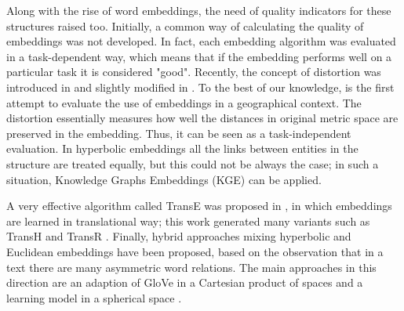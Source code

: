 Along with the rise of word embeddings, the need of quality indicators for these structures raised too. 
Initially, a common way of calculating the quality of embeddings was not developed. 
In fact, each embedding algorithm was evaluated in a task-dependent way, which means that if the embedding performs well on a particular task it is considered "good". 
Recently, the concept of distortion was introduced in \cite{sala2018representation} and slightly modified in \cite{dassereto2019evaluating}. 
To the best of our knowledge, \cite{dassereto2019evaluating} is the first attempt to evaluate the use of embeddings in a geographical context. 
The distortion essentially measures how well the distances in original metric space are preserved in the embedding. Thus, it can be seen as a task-independent evaluation. In hyperbolic embeddings all the links between entities in the structure are treated equally, but this could not be always the case; in such a situation, Knowledge Graphs Embeddings (KGE) can be applied. 

A very effective algorithm called TransE was proposed in \cite{bordes2013translating}, in which embeddings are learned in translational way; this work generated many variants such as TransH \cite{wang2014knowledge} and TransR \cite{lin2015learning}. 
Finally, hybrid approaches mixing hyperbolic and Euclidean embeddings have been proposed, based on the observation that in a text there are many asymmetric word relations. The main approaches in this direction are an adaption of GloVe in a Cartesian product of spaces \cite{tifrea2018poincare} and a learning model in a spherical space \cite{meng2019spherical}.  
{\color{red}{AGGIUNGI Papotti e Keynote PODS.}}



